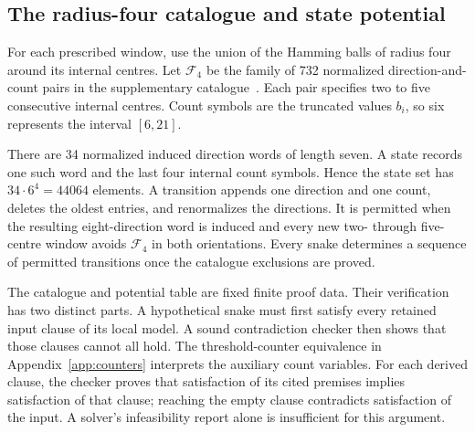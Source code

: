 \documentclass[11pt,a4paper]{article}
\theoremstyle{definition}
\theoremstyle{remark}
\begin{document}
\subsection{The radius-four catalogue and state potential}\label{sec:radius-four-236}
For each prescribed window, use the union of the Hamming balls of radius four around its internal centres. Let $\mathcal F_4$ be the family of 732 normalized direction-and-count pairs in the supplementary catalogue~\cite{radiusfourarchive}. Each pair specifies two to five consecutive internal centres. Count symbols are the truncated values $b_i$, so six represents the interval $[6,21]$.

There are 34 normalized induced direction words of length seven. A state records one such word and the last four internal count symbols. Hence the state set has $34\cdot6^4=44064$ elements. A transition appends one direction and one count, deletes the oldest entries, and renormalizes the directions. It is permitted when the resulting eight-direction word is induced and every new two- through five-centre window avoids $\mathcal F_4$ in both orientations. Every snake determines a sequence of permitted transitions once the catalogue exclusions are proved.

The catalogue and potential table are fixed finite proof data. Their verification has two distinct parts. A hypothetical snake must first satisfy every retained input clause of its local model. A sound contradiction checker then shows that those clauses cannot all hold. The threshold-counter equivalence in Appendix~\ref{app:counters} interprets the auxiliary count variables. For each derived clause, the checker proves that satisfaction of its cited premises implies satisfaction of that clause; reaching the empty clause contradicts satisfaction of the input. A solver's infeasibility report alone is insufficient for this argument.
\end{document}
